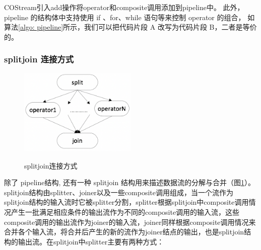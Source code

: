 COStream引入add操作将operator和composite调用添加到pipeline中。 此外， pipeline 的结构体中支持使用 if 、for、while 语句等来控制 operator 的组合， 如算法\ref{algo: pipeline}所示，我们可以把代码片段 A 改写为代码片段 B，二者是等价的。





\subsubsection{splitjoin 连接方式}

\begin{figure}[htbp]
  \centering
  \includegraphics[width=0.5\textwidth]{Img/Chap_Application/Yu/splitjoin.png}\\
  \caption{splitjoin连接方式}\label{fig:splitjoin}
\end{figure}

除了 pipeline结构, 还有一种 splitjoin 结构用来描述数据流的分解与合并（图\ref{fig:splitjoin}）。splitjoin结构由splitter、joiner以及一些composite调用组成，当一个流作为splitjoin结构的输入流时它被splitter分割，splitter根据splitjoin中composite调用情况产生一批满足相应条件的输出流作为不同的composite调用的输入流，这些composite调用的输出流作为joiner的输入流，joiner同样根据composite调用情况来合并各个输入流，将合并后产生的新的流作为joiner结点的输出，也是splitjoin结构的输出流。在splitjoin中splitter主要有两种方式：

